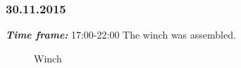 \subsubsection{30.11.2015}
\textit{\textbf{Time frame:}} 17:00-22:00 \newline
The winch was assembled.

\begin{figure}[H]
	\begin{minipage}[h]{1\linewidth}
		\caption{Winch}
	\end{minipage}
\end{figure}
